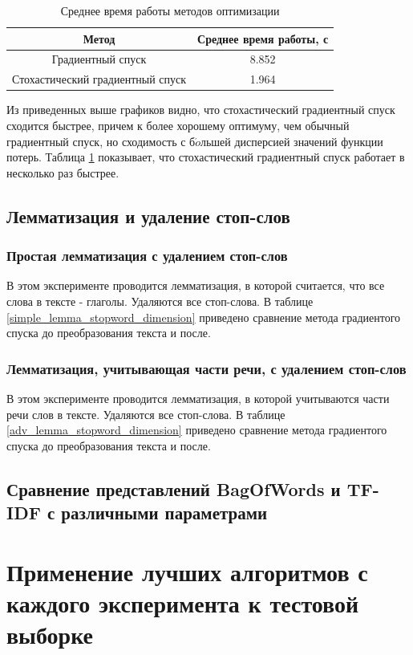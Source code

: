 \documentclass[a4paper, 11pt]{article}
\begin{document}
           \begin{table}
               \caption{Среднее время работы методов оптимизации}
               \label{sgd_gd_time}
               \begin{center}
                   \begin{tabular}{|c|c|}  
                       \hline 
                       Метод & Среднее время работы, с \\ 
                       \hline 
                       Градиентный спуск & 8.852 \\ 
                       \hline 
                       Стохастический градиентный спуск & 1.964 \\ 
                       \hline 
                   \end{tabular}
               \end{center}
           \end{table}
       
           Из приведенных выше графиков видно, что стохастический градиентный спуск сходится быстрее, причем к более хорошему оптимуму, чем обычный градиентный спуск, но сходимость с б$\acute{o}$льшей дисперсией значений функции потерь. Таблица \ref{sgd_gd_time} показывает, что стохастический градиентный спуск работает в несколько раз быстрее.
            
        \subsection{Лемматизация и удаление стоп-слов}
            \subsubsection{Простая лемматизация с удалением стоп-слов}
                В этом эксперименте проводится лемматизация, в которой считается, что все слова в тексте - глаголы. Удаляются все стоп-слова. В таблице \ref{simple_lemma_stopword_dimension} приведено сравнение метода градиентого спуска до преобразования текста и после.
            \subsubsection{Лемматизация, учитывающая части речи, с удалением стоп-слов}
                 В этом эксперименте проводится лемматизация, в которой учитываются части речи слов в тексте. Удаляются все стоп-слова. В таблице \ref{adv_lemma_stopword_dimension} приведено сравнение метода градиентого спуска до преобразования текста и после.
                
        
        \subsection{Сравнение представлений BagOfWords и TF-IDF с различными параметрами}
        
    \section{Применение лучших алгоритмов с каждого эксперимента к тестовой выборке}
    
       
        
        
            
\end{document}
